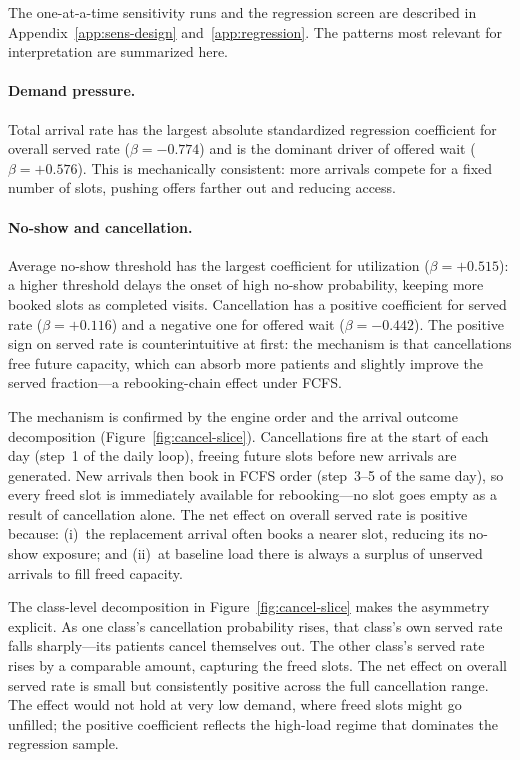 \documentclass[11pt]{article}
\begin{document}
The one-at-a-time sensitivity runs and the regression screen are described
in Appendix~\ref{app:sens-design} and~\ref{app:regression}. The patterns
most relevant for interpretation are summarized here.

\paragraph{Demand pressure.}
Total arrival rate has the largest absolute standardized regression
coefficient for overall served rate ($\beta = -0.774$) and is the
dominant driver of offered wait ($\beta = +0.576$). This is mechanically
consistent: more arrivals compete for a fixed number of slots, pushing
offers farther out and reducing access.

\paragraph{No-show and cancellation.}
Average no-show threshold has the largest coefficient for utilization
($\beta = +0.515$): a higher threshold delays the onset of high no-show
probability, keeping more booked slots as completed visits. Cancellation
has a positive coefficient for served rate ($\beta = +0.116$) and a
negative one for offered wait ($\beta = -0.442$). The positive sign on
served rate is counterintuitive at first: the mechanism is that
cancellations free future capacity, which can absorb more patients and
slightly improve the served fraction---a rebooking-chain effect under FCFS.

The mechanism is confirmed by the engine order and the arrival outcome
decomposition (Figure~\ref{fig:cancel-slice}). Cancellations fire at the
start of each day (step~1 of the daily loop), freeing future slots before
new arrivals are generated. New arrivals then book in FCFS order (step~3--5
of the same day), so every freed slot is immediately available for
rebooking---no slot goes empty as a result of cancellation alone. The net
effect on overall served rate is positive because: (i)~the replacement
arrival often books a nearer slot, reducing its no-show exposure; and
(ii)~at baseline load there is always a surplus of unserved arrivals to fill
freed capacity.

The class-level decomposition in Figure~\ref{fig:cancel-slice} makes the
asymmetry explicit. As one class's cancellation probability rises, that
class's own served rate falls sharply---its patients cancel themselves out.
The other class's served rate rises by a comparable amount, capturing the
freed slots. The net effect on overall served rate is small but consistently
positive across the full cancellation range. The effect would not hold at
very low demand, where freed slots might go unfilled; the positive
coefficient reflects the high-load regime that dominates the regression
sample.
\end{document}
